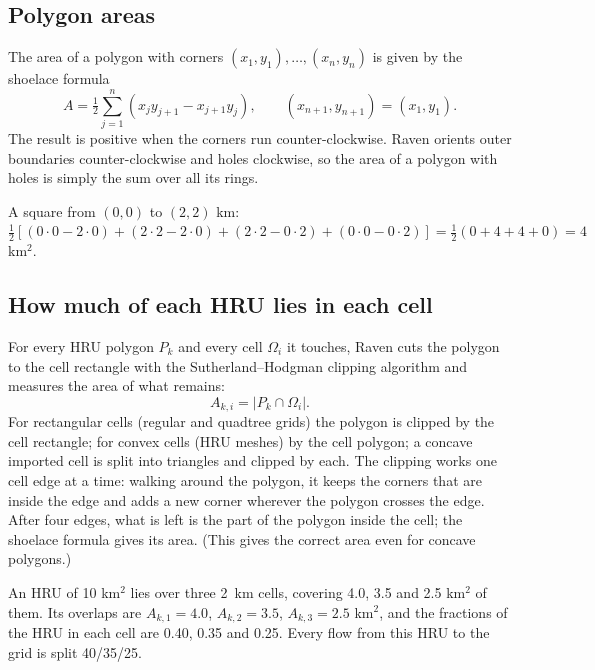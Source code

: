 \subsection{Polygon areas}
The area of a polygon with corners $(x_1,y_1),\dots,(x_n,y_n)$ is given by the shoelace formula
\begin{equation}
A=\tfrac12\sum_{j=1}^{n}\left(x_jy_{j+1}-x_{j+1}y_j\right),\qquad (x_{n+1},y_{n+1})=(x_1,y_1).
\end{equation}
The result is positive when the corners run counter-clockwise. Raven orients outer boundaries counter-clockwise and
holes clockwise, so the area of a polygon with holes is simply the sum over all its rings.
\begin{example}
A square from $(0,0)$ to $(2,2)$ km: $\tfrac12[(0\cdot0-2\cdot0)+(2\cdot2-2\cdot0)+(2\cdot2-0\cdot2)+(0\cdot0-0\cdot2)]=\tfrac12(0+4+4+0)=4$ km$^2$.
\end{example}

\subsection{How much of each HRU lies in each cell}\label{sec:linkage}
For every HRU polygon $P_k$ and every cell $\Omega_i$ it touches, Raven cuts the polygon to the cell rectangle with
the Sutherland--Hodgman clipping algorithm \cite{sutherland1974clip} and measures the area of what remains:
\begin{equation}
A_{k,i}=\left|P_k\cap\Omega_i\right| .
\end{equation}
For rectangular cells (regular and quadtree grids) the polygon is clipped by the cell rectangle; for convex cells (HRU
meshes) by the cell polygon; a concave imported cell is split into triangles and clipped by each. The clipping works one
cell edge at a time: walking around the polygon, it keeps the corners that are inside the edge
and adds a new corner wherever the polygon crosses the edge. After four edges, what is left is the part of the polygon
inside the cell; the shoelace formula gives its area. (This gives the correct area even for concave polygons.)

\begin{example}
An HRU of 10 km$^2$ lies over three 2~km cells, covering 4.0, 3.5 and 2.5 km$^2$ of them. Its overlaps are
$A_{k,1}=4.0$, $A_{k,2}=3.5$, $A_{k,3}=2.5$ km$^2$, and the fractions of the HRU in each cell are 0.40, 0.35 and 0.25.
Every flow from this HRU to the grid is split 40/35/25.
\end{example}

